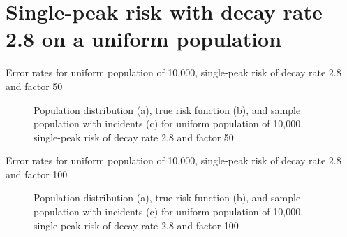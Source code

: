  
\section{Single-peak risk with decay rate 2.8 on a uniform population}
\label{sec:app:results_unif_2.8_1h}

\graphicspath{{./results/unif_50_2.8_1h/}}
\makeatletter
{}
\makeatother

\begin{table}[H]
    
    \caption[]{Error rates for uniform population of 10,000, single-peak risk of decay rate 2.8 and factor 50}
    \label{tab:mean_error_rates:unif_50_2.8_1h}
\end{table}

\begin{figure}[H]
    
    \caption[]{Population distribution (a), true risk function (b), and sample population with incidents (c) for uniform population of 10,000, single-peak risk of decay rate 2.8 and factor 50}
    \label{fig:distributions:unif_50_2.8_1h}    
\end{figure}


\graphicspath{{./results/unif_100_2.8_1h/}}
\makeatletter
{}
\makeatother

\begin{table}[H]

\caption[]{Error rates for uniform population of 10,000, single-peak risk of decay rate 2.8 and factor 100}
\label{tab:mean_error_rates:unif_100_2.8_1h}
\end{table}

\begin{figure}[H]
    
    \caption[]{Population distribution (a), true risk function (b), and sample population with incidents (c) for uniform population of 10,000, single-peak risk of decay rate 2.8 and factor 100}
    \label{fig:distributions:unif_100_2.8_1h}    
\end{figure}


\graphicspath{{./results/unif_200_2.8_1h/}}
\makeatletter
{}
\makeatother

